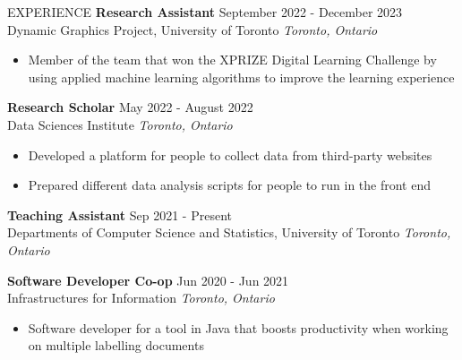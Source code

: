 \documentclass{resume} %
\begin{document}
\begin{rSection}{EXPERIENCE}
    \textbf{Research Assistant} \hfill September 2022 - December 2023\\Dynamic Graphics Project, University of Toronto \hfill \textit{Toronto, Ontario}
    \begin{itemize}
        \itemsep -3pt {} 
        \item Member of the team that won the XPRIZE Digital Learning Challenge by using applied machine learning algorithms to improve the learning experience
    \end{itemize}

    \textbf{Research Scholar} \hfill May 2022 - August 2022\\Data Sciences Institute \hfill \textit{Toronto, Ontario}
    \begin{itemize}
        \itemsep -3pt {} 
        \item Developed a platform for people to collect data from third-party websites
        \item Prepared different data analysis scripts for people to run in the front end
    \end{itemize}

 
    \textbf{Teaching Assistant} \hfill Sep 2021 - Present\\Departments of Computer Science and Statistics, University of Toronto \hfill \textit{Toronto, Ontario}
    
    \textbf{Software Developer Co-op} \hfill Jun 2020 - Jun 2021\\Infrastructures for Information \hfill \textit{Toronto, Ontario}
    \begin{itemize}
        \itemsep -3pt {} 
        \item Software developer for a tool in Java that boosts productivity when working on multiple labelling documents
    \end{itemize}

\end{rSection} 

\end{document}
